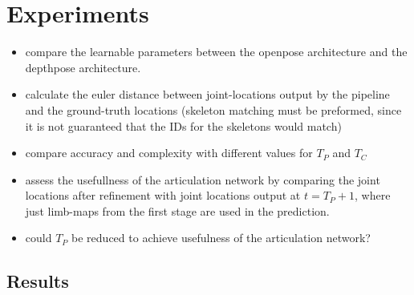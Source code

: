 \chapter{Experiments}


\begin{itemize}
\item compare the learnable parameters between the openpose architecture and the depthpose architecture.
\item calculate the euler distance between joint-locations output by the pipeline and the ground-truth locations (skeleton matching must be preformed, since it is not guaranteed that the IDs for the skeletons would match)
\item compare accuracy and complexity with different values for $T_{P}$ and $T_{C}$
\item assess the usefullness of the articulation network by comparing the joint locations after refinement with joint locations output at $t = T_{P} + 1$, where just limb-maps from the first stage are used in the prediction.
\item could $T_{P}$ be reduced to achieve usefulness of the articulation network?
\end{itemize}


\section{Results}
